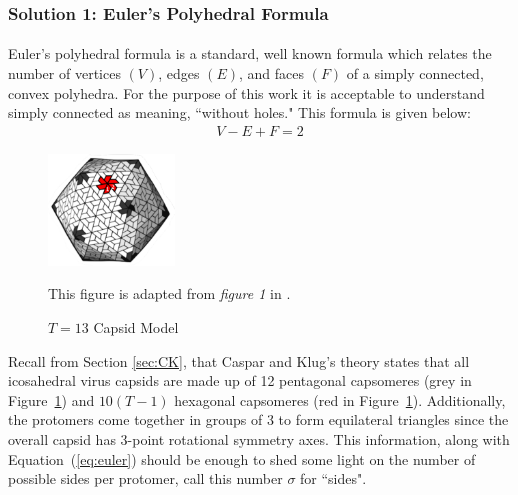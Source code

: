 \documentclass[12pt,letter]{article}
\begin{document}
\subsubsection{Solution 1: Euler's Polyhedral Formula} \label{sec:euler}
\paragraph{}
Euler's polyhedral formula is a standard, well known formula which relates the number of vertices $(V)$, edges $(E)$, and faces $(F)$ of a simply connected, convex polyhedra. For the purpose of this work it is acceptable to understand simply connected as meaning, ``without holes." This formula is given below:
\begin{align}
	V - E + F = 2
	\label{eq:euler}
\end{align}
%
\begin{figure}
	\centering
	\caption{$T = 13$ Capsid Model}
	\includegraphics[width = 0.30\textwidth]{capsid_T13.pdf}
	\begin{minipage}[h]{.35\textwidth}
		\begin{footnotesize}
		This figure is adapted from \textit{figure 1} in \cite{Mannige:2009}.
		\end{footnotesize}
	\end{minipage}
	\label{fig:T13}
	\vspace{-35pt}
\end{figure}

Recall from Section \ref{sec:CK}, that Caspar and Klug's theory states that all icosahedral virus capsids are made up of 12 pentagonal capsomeres (grey in Figure~\ref{fig:T13}) and $10(T-1)$ hexagonal capsomeres (red in Figure~\ref{fig:T13}). Additionally, the protomers come together in groups of 3 to form equilateral triangles since the overall capsid has 3-point rotational symmetry axes. This information, along with Equation~(\ref{eq:euler}) should be enough to shed some light on the number of possible sides per protomer, call this number $\sigma$ for ``sides".
\end{document}
